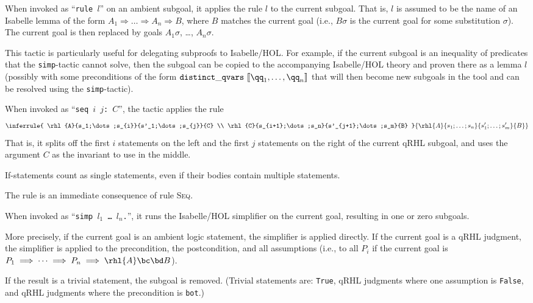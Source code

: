 \documentclass{article}
\renewcommand\ruleref[1]{rule \hbox{\textsc{#1}}}
\begin{document}

When invoked as ``\texttt{\frenchspacing rule $l$}''
on an ambient subgoal, it applies the rule $l$
to the current subgoal. That is, $l$
is assumed to be the name of an Isabelle lemma of the form
$A_1\Longrightarrow\dots\Longrightarrow A_n\Longrightarrow B$,
where $B$
matches the current goal (i.e., $B\sigma$
is the current goal for some substitution $\sigma$). The current goal is then replaced by goals
$A_1\sigma$, \dots, $A_n\sigma$.

This tactic is particularly useful for delegating subproofs to
Isabelle/HOL. For example, if the current subgoal is an inequality of
predicates that the \texttt{simp}-tactic cannot solve, then the
subgoal can be copied to the accompanying Isabelle/HOL theory and
proven there as a lemma $l$
(possibly with some preconditions of the form
$\mathtt{distinct\_qvars}\ \llbracket \qq_1,\dots,\qq_n\rrbracket$
that will then become new subgoals in the tool and can be resolved
using the \texttt{simp}-tactic).


When invoked as ``\texttt{\frenchspacing seq $i$ $j$: $C$}'', the tactic applies the rule
\[
  \inferrule
  {
    \rhl{A}{s_1;\dots;s_{i}}{s'_1;\dots;s_{j}}{C}
    \\
    \rhl{C}{s_{i+1};\dots;s_n}{s'_{j+1};\dots;s_m}{B}
  }
  {\rhl{A}{s_1;\dots;s_n}{s'_1;\dots;s'_m}{B}}
\]
That is, it splits off the first $i$
statements on the left and the first $j$
statements on the right of the current qRHL subgoal, and uses the
argument $C$ as the invariant to use in the middle.

If-statements count as single statements, even if their bodies contain
multiple statements.

The rule is an immediate consequence of \ruleref{Seq}.


When invoked as ``\texttt{simp $l_1$
  \dots{} $l_n$.}'',
it runs the Isabelle/HOL simplifier on the current goal, resulting in
one or zero subgoals.

More precisely, if the current goal is an ambient logic statement, the
simplifier is applied directly. If the current goal is a qRHL
judgment, the simplifier is applied to the precondition, the
postcondition, and all assumptions (i.e., to all $P_i$
if the current goal is $P_1\implies\dots\implies P_n\implies \rhl{A}\bc\bd B$).

If the result is a trivial statement, the subgoal is removed. (Trivial
statements are: \texttt{True}, qRHL judgments where one assumption is
\texttt{False}, and qRHL judgments where the precondition is
\texttt{bot}.)
\end{document}

